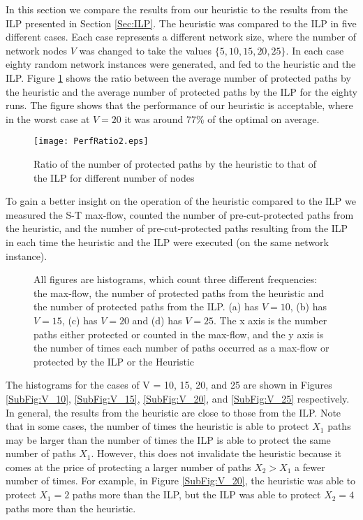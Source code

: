 \documentclass[conference]{IEEEtran}
\begin{document}
In this section we compare the results from our heuristic to the results from the ILP presented in Section \ref{Sec:ILP}. The heuristic was compared to the ILP in five different cases. Each case represents a different network size, where the number of network nodes $V$ was changed to take the values $\{5, 10, 15, 20, 25\}$. In each case eighty random network instances were generated, and fed to the heuristic and the ILP. Figure \ref{Fig:PerfRatio} shows the ratio between the average number of protected paths by the heuristic and the average number of protected paths by the ILP for the eighty runs. The figure shows that the performance of our heuristic is acceptable, where in the worst case at $V=20$ it was around 77\% of the optimal on average.
 
\begin{figure}[tbh]
\centering
\texttt{[image: PerfRatio2.eps]}
\caption{Ratio of the number of protected paths by the heuristic to that of the ILP for different number of nodes}
\label{Fig:PerfRatio}
\end{figure}

To gain a better insight on the operation of the heuristic compared to the ILP we measured the S-T max-flow, counted the number of pre-cut-protected paths from the heuristic, and the number of pre-cut-protected paths resulting from the ILP in each time the heuristic and the ILP were executed (on the same network instance). 

\begin{figure*}[htp]
\begin{center}
\end{center}
\caption{All figures are histograms, which count three different frequencies: the max-flow, the number of protected paths from the heuristic and the number of protected paths from the ILP. (a) has $V=10$, (b) has $V=15$, (c) has $V=20$ and (d) has $V=25$. The x axis is the number paths either protected or counted in the max-flow, and the y axis is the number of times each number of paths occurred as a max-flow or protected by the ILP or the Heuristic}
\label{Fig:Results}
\end{figure*}


The histograms for the cases of V = 10, 15, 20, and 25 are shown in Figures \ref{SubFig:V_10}, \ref{SubFig:V_15}, \ref{SubFig:V_20}, and \ref{SubFig:V_25} respectively. In general, the results from the heuristic are close to those from the ILP. Note that in some cases, the number of times the heuristic is able to protect $X_1$ paths may be larger than the number of times the ILP is able to protect the same number of paths $X_1$. However, this does not invalidate the heuristic because it comes at the price of protecting a larger number of paths $X_2 > X_1$ a fewer number of times. For example, in Figure \ref{SubFig:V_20}, the heuristic was able to protect $X_1 = 2$ paths more than the ILP, but the ILP was able to protect $X_2 = 4$ paths more than the heuristic. 
\end{document}
